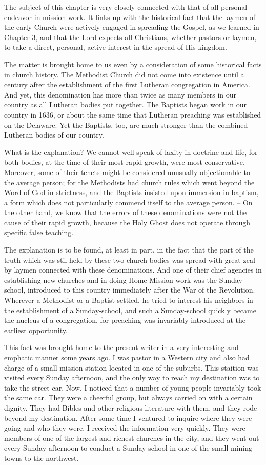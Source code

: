 \documentclass[
]{book}
\begin{document}
The subject of this chapter is very closely connected with that of all personal endeavor in mission work. It links up with the historical fact that the laymen of the early Church were actively engaged in spreading the Gospel, as we learned in Chapter 3, and that the Lord expects all Christians, whether pastors or laymen, to take a direct, personal, active interest in the spread of His kingdom.

The matter is brought home to us even by a consideration of some historical facts in church history. The Methodist Church did not come into existence until a century after the establishment of the first Lutheran congregation in America. And yet, this denomination has more than twice as many members in our country as all Lutheran bodies put together. The Baptists began work in our country in 1636, or about the same time that Lutheran preaching was established on the Delaware. Yet the Baptists, too, are much stronger than the combined Lutheran bodies of our country.

What is the explanation? We cannot well speak of laxity in doctrine and life, for both bodies, at the time of their most rapid growth, were most conservative. Moreover, some of their tenets might be considered unusually objectionable to the average person; for the Methodists had church rules which went beyond the Word of God in strictness, and the Baptists insisted upon immersion in baptism, a form which does not particularly commend itself to the average person. -- On the other hand, we know that the errors of these denominations were not the cause of their rapid growth, because the Holy Ghost does not operate through specific false teaching.

The explanation is to be found, at least in part, in the fact that the part of the truth which was stil held by these two church-bodies was spread with great zeal by laymen connected with these denominations. And one of their chief agencies in establishing new churches and in doing Home Mission work was the Sunday-school, introduced to this country immediately after the War of the Revolution. Wherever a Methodist or a Baptist settled, he tried to interest his neighbors in the establishment of a Sunday-school, and such a Sunday-school quickly became the nucleus of a congregation, for preaching was invariably introduced at the earliest opportunity.

This fact was brought home to the present writer in a very interesting and emphatic manner some years ago. I was pastor in a Western city and also had charge of a small mission-station located in one of the suburbs. This staition was visited every Sunday afternoon, and the only way to reach my destination was to take the street-car. Now, I noticed that a number of young people invariably took the same car. They were a cheerful group, but always carried on with a certain dignity. They had Bibles and other religious literature with them, and they rode beyond my destination. After some time I ventured to inquire where they were going and who they were. I received the information very quickly. They were members of one of the largest and richest churches in the city, and they went out every Sunday afternoon to conduct a Sunday-school in one of the small mining-towns to the northwest.
\end{document}
